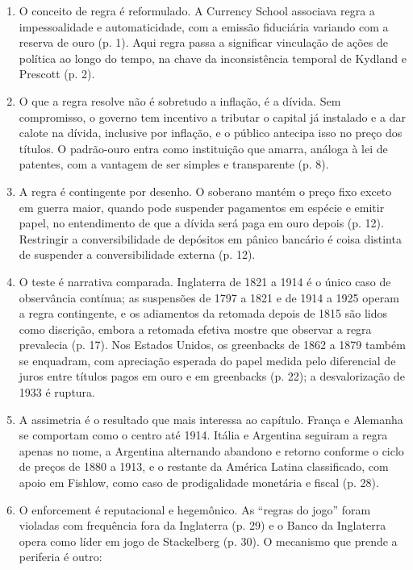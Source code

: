\begin{enumerate}
\item O conceito de regra é reformulado. A Currency School associava regra a
impessoalidade e automaticidade, com a emissão fiduciária variando com a
reserva de ouro (p. 1). Aqui regra passa a significar vinculação de ações de
política ao longo do tempo, na chave da inconsistência temporal de Kydland e
Prescott (p. 2).

\item O que a regra resolve não é sobretudo a inflação, é a dívida. Sem
compromisso, o governo tem incentivo a tributar o capital já instalado e a dar
calote na dívida, inclusive por inflação, e o público antecipa isso no preço
dos títulos. O padrão-ouro entra como instituição que amarra, análoga à lei de
patentes, com a vantagem de ser simples e transparente (p. 8).

\item A regra é contingente por desenho. O soberano mantém o preço fixo exceto
em guerra maior, quando pode suspender pagamentos em espécie e emitir papel, no
entendimento de que a dívida será paga em ouro depois (p. 12). Restringir a
conversibilidade de depósitos em pânico bancário é coisa distinta de suspender
a conversibilidade externa (p. 12).

\item O teste é narrativa comparada. Inglaterra de 1821 a 1914 é o único caso
de observância contínua; as suspensões de 1797 a 1821 e de 1914 a 1925 operam
a regra contingente, e os adiamentos da retomada depois de 1815 são lidos como
discrição, embora a retomada efetiva mostre que observar a regra prevalecia
(p. 17). Nos Estados Unidos, os greenbacks de 1862 a 1879 também se enquadram,
com apreciação esperada do papel medida pelo diferencial de juros entre títulos
pagos em ouro e em greenbacks (p. 22); a desvalorização de 1933 é ruptura.

\item A assimetria é o resultado que mais interessa ao capítulo. França e
Alemanha se comportam como o centro até 1914. Itália e Argentina seguiram a
regra apenas no nome, a Argentina alternando abandono e retorno conforme o
ciclo de preços de 1880 a 1913, e o restante da América Latina classificado,
com apoio em Fishlow, como caso de prodigalidade monetária e fiscal (p. 28).

\item O enforcement é reputacional e hegemônico. As ``regras do jogo'' foram
violadas com frequência fora da Inglaterra (p. 29) e o Banco da Inglaterra
opera como líder em jogo de Stackelberg (p. 30). O mecanismo que prende a
periferia é outro:
\end{enumerate}

